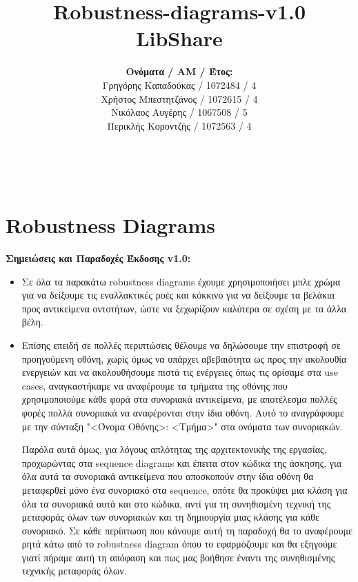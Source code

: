 \documentclass[12pt,a4paper]{article}
\title{Robustness-diagrams-v1.0 \\ LibShare}
\author{\textbf{Ονόματα / ΑΜ / Έτος:} \\ Γρηγόρης Καπαδούκας / 1072484 / 4\textdegree \\ Χρήστος Μπεστητζάνος / 1072615 / 4\textdegree \\ Νικόλαος Αυγέρης / 1067508 / 5\textdegree \\ Περικλής Κοροντζής / 1072563 / 4\textdegree}
\begin{document}
\makeatletter
\begin{center}
	\LARGE{\@title} \\
	\pagebreak
    \begin{LARGE}\@author\end{LARGE}
    \pagebreak
\end{center}

\section{Robustness Diagrams}

\textbf{Σημειώσεις και Παραδοχές Έκδοσης v1.0:}
\begin{itemize}
    \item Σε όλα τα παρακάτω robustness diagrams έχουμε χρησιμοποιήσει μπλε χρώμα για να δείξουμε τις εναλλακτικές ροές και κόκκινο για να δείξουμε τα βελάκια προς αντικείμενα οντοτήτων, ώστε να ξεχωρίζουν καλύτερα σε σχέση με τα άλλα βέλη.

    \item Επίσης επειδή σε πολλές περιπτώσεις θέλουμε να δηλώσουμε την επιστροφή σε προηγούμενη οθόνη, χωρίς όμως να υπάρχει αβεβαιότητα ως προς την ακολουθία ενεργειών και να ακολουθήσουμε πιστά τις ενέργειες όπως τις ορίσαμε στα use cases, αναγκαστήκαμε να αναφέρουμε τα τμήματα της οθόνης που χρησιμοποιούμε κάθε φορά στα συνοριακά αντικείμενα, με αποτέλεσμα πολλές φορές πολλά συνοριακά να αναφέρονται στην ίδια οθόνη. Αυτό το αναγράφουμε με την σύνταξη "<Όνομα Οθόνης>: <Τμήμα>" στα ονόματα των συνοριακών.

Παρόλα αυτά όμως, για λόγους απλότητας της αρχιτεκτονικής της εργασίας, προχωρώντας στα sequence diagrams και έπειτα στον κώδικα της άσκησης, για όλα αυτά τα συνοριακά αντικείμενα που αποσκοπούν στην ίδια οθόνη θα μεταφερθεί μόνο ένα συνοριακό στα sequence, οπότε θα προκύψει μια κλάση για όλα τα συνοριακά αυτά και στο κώδικα, αντί για τη συνηθισμένη τεχνική της μεταφοράς όλων των συνοριακών και τη δημιουργία μιας κλάσης για κάθε συνοριακό. Σε κάθε περίπτωση που κάνουμε αυτή τη παραδοχή θα το αναφέρουμε ρητά κάτω από το robustness diagram όπου το εφαρμόζουμε και θα εξηγούμε γιατί πήραμε αυτή τη απόφαση και πως μας βοήθησε έναντι της συνηθισμένης τεχνικής μεταφοράς όλων.


\end{itemize}
\end{document}
